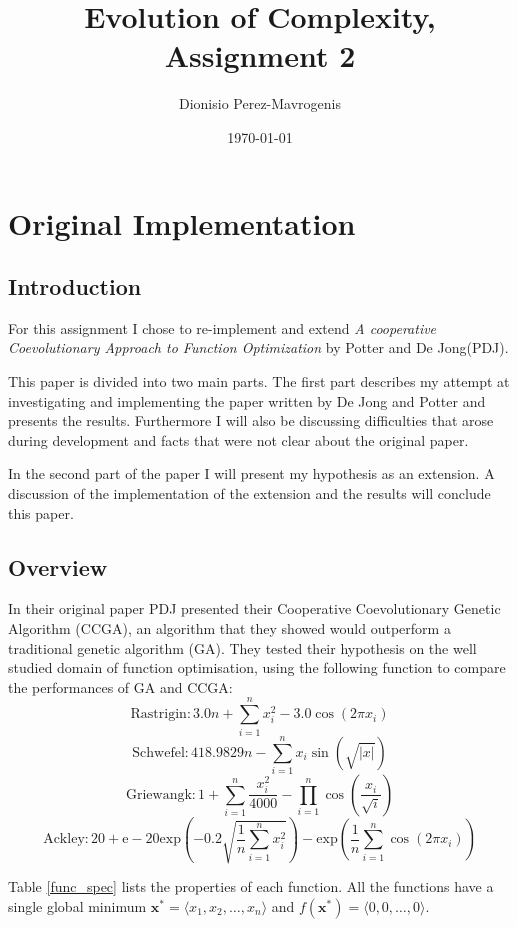 \documentclass[12pt,a4paper,onecolumn]{article}
\begin{document}
\title{Evolution of Complexity, Assignment 2}
\author{Dionisio Perez-Mavrogenis}
\date{\today}
\maketitle

\section{Original Implementation}
\subsection{Introduction}
For this assignment I chose to re-implement and extend \emph{A cooperative Coevolutionary Approach to Function Optimization}\cite{PDJ} by Potter and De Jong(PDJ).

This paper is divided into two main parts. The first part describes my attempt at investigating and implementing the paper written by De Jong and Potter and presents the results. Furthermore I will also be discussing difficulties that arose during development and facts that were not clear about the original paper.

In the second part of the paper I will present my hypothesis as an extension. A discussion of the implementation of the extension and the results will conclude this paper.

\subsection{Overview}
\label{overview}
In their original paper PDJ presented their Cooperative Coevolutionary Genetic Algorithm (CCGA), an algorithm that they showed would outperform a traditional genetic algorithm (GA). They tested their hypothesis on the well studied domain of function optimisation, using the following function to compare the performances of GA and CCGA:
$$ \mathrm{Rastrigin} : 3.0n + \sum_{i=1}^{n} x_i^2 - 3.0\cos(2\pi x_i) $$
$$ \mathrm{Schwefel} : 418.9829n-\sum^{n}_{i=1}x_i\sin \left(\sqrt{|x|}\right) $$
$$ \mathrm{Griewangk} : 1+\sum^{n}_{i=1} \frac{x_i^2}{4000}-\prod^{n}_{i=1}\cos \left(\frac{x_i}{\sqrt{i}}\right) $$
$$\mathrm{Ackley} : 20 + \mathrm{e} - 20 \mathrm{exp}\left( -0.2\sqrt{\frac{1}{n}\sum^{n}_{i=1}x_i^2} \right) -\mathrm{exp}\left( \frac{1}{n}\sum^{n}_{i=1}\cos(2 \pi x_i) \right) $$

Table \ref{func_spec} lists the properties of each function. All the functions have a single global minimum $\mathbf{x^*} = \langle x_1, x_2,\ldots , x_n \rangle$  and $ f\left( \mathbf{x^*}\right) = \langle 0,0,\ldots,0 \rangle $.
\end{document}
